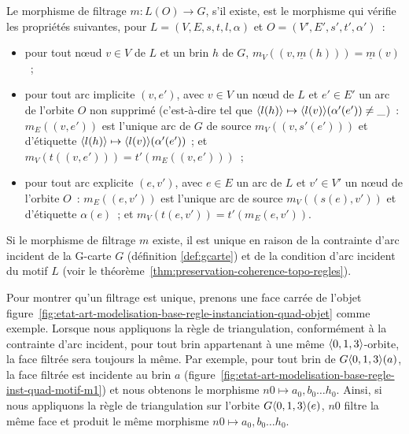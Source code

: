 \begin{definition}\label{def:filtrage-orbite-instanciation}%
	Le morphisme de filtrage $m : L(O) \rightarrow G$, s'il existe, est le morphisme qui
	vérifie les propriétés suivantes, pour $L = (V, E, s, t, l, \alpha)$ et
	$O = (V', E', s', t', \alpha')$~:
	\begin{itemize}
      \item pour tout n\oe ud $v \in V$ de $L$ et un brin $h$ de $G$,
            $m_V((v,\underline{m}(h))) = \underline{m}(v)$~;
		\item pour tout arc implicite $(v,e')$, avec $v \in V$ un n\oe ud de $L$ et
		      $e' \in E'$ un arc de l'orbite $O$ non supprimé (c'est-à-dire tel que
		      $\langle l(h)\rangle \mapsto \langle l(v)\rangle (\alpha'(e')) \neq \_$)~: $m_E((v,e'))$ est
		      l'unique arc de $G$ de source $m_V((v, s'(e')))$ et d'étiquette
		      $\langle l(h)\rangle \mapsto \langle l(v)\rangle(\alpha'(e'))$ ; et
		      $m_V(t((v, e'))) = t'(m_E((v,e')))$~;
		\item pour tout arc explicite $(e, v')$, avec $e \in E$ un arc de $L$ et
		      $v' \in V'$ un n\oe ud de l'orbite $O$~: $m_E((e, v'))$ est l'unique arc de
		      source $m_V((s(e), v'))$ et d'étiquette $\alpha(e)$~; et
		      $m_V(t(e,v')) = t'(m_E(e,v'))$.
	\end{itemize}
\end{definition}

\begin{remarque}
	Si le morphisme de filtrage $m$ existe, il est unique en raison de la
	contrainte d'arc incident de la G-carte $G$ (définition \ref{def:gcarte})
    et de la condition d'arc incident du motif $L$
	(voir le théorème~\ref{thm:preservation-coherence-topo-regles}).
\end{remarque}

Pour montrer qu'un filtrage est unique, prenons une face carrée de l'objet
figure~\ref{fig:etat-art-modelisation-base-regle-instanciation-quad-objet} comme
exemple. %
Lorsque nous appliquons la règle de triangulation, conformément à la contrainte
d'arc incident, pour tout brin appartenant à une même \(\langle0,1,3\rangle\)-orbite,
la face filtrée sera toujours la même. %
Par exemple, pour tout brin de \(G\langle0,1,3\rangle(a)\), la face filtrée est
incidente au brin \(a\)
(figure~\ref{fig:etat-art-modelisation-base-regle-inst-quad-motif-m1}) et nous
obtenons le morphisme \(n0 \mapsto {a_{0},b_{0}\dots h_{0}}\). %
Ainsi, si nous appliquons la règle de triangulation sur l'orbite
\(G\langle0,1,3\rangle(e)\), \(n0\) filtre la même face et produit le même morphisme
\(n0 \mapsto {a_{0},b_{0}\dots h_{0}}\). %

